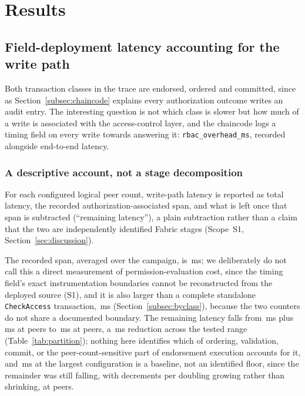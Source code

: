\documentclass[a4paper,fleqn]{cas-sc}
\begin{document}
\FloatBarrier
\section{Results}
\label{sec:results}

\subsection{Field-deployment latency accounting for the write path}
\label{subsec:decomposition}

Both transaction classes in the trace are endorsed, ordered and committed,
since as Section~\ref{subsec:chaincode} explains every authorization outcome
writes an audit entry. The interesting question is not which class is
slower but how much of a write is associated with the access-control layer,
and the chaincode logs a timing field on every write towards answering it:
\texttt{rbac\_overhead\_ms}, recorded alongside end-to-end latency.

\subsubsection{A descriptive account, not a stage decomposition}
\label{subsubsec:partition}

For each configured logical peer count, write-path latency is reported as
total latency, the recorded authorization-associated span, and what is
left once that span is subtracted (``remaining latency''), a plain
subtraction rather than a claim that the two are independently identified
Fabric stages (Scope~S1, Section~\ref{sec:discussion}).

The recorded span, averaged over the campaign, is \PartAccess\,ms; we
deliberately do not call this a direct measurement of permission-evaluation
cost, since the timing field's exact instrumentation boundaries cannot be
reconstructed from the deployed source (S1), and it is also larger than a
complete standalone \texttt{CheckAccess} transaction, \DecisionMean\,ms
(Section~\ref{subsec:byclass}), because the two counters do not share a
documented boundary. The remaining latency falls from \PartRemainder\,ms
plus \PartEndorser\,ms at \ScaleMinPeers{} peers to \PartRemainder\,ms at
\ScaleMaxPeers{} peers, a \PartEndorser\,ms reduction across the tested
range (Table~\ref{tab:partition}); nothing here identifies which of
ordering, validation, commit, or the peer-count-sensitive part of
endorsement execution accounts for it, and \PartRemainder\,ms at the
largest configuration is a baseline, not an identified floor, since the
remainder was still falling, with decrements per doubling growing rather
than shrinking, at \ScaleMaxPeers{} peers.
\end{document}
